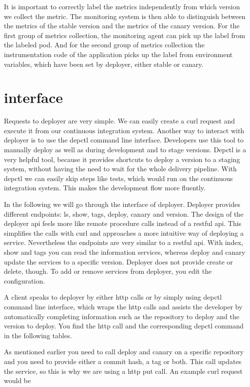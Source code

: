 It is important to correctly label the metrics independently from which version we collect
the metric. The monitoring system is then able to distinguish between the metrics of the
stable version and the metrics of the canary version. For the first group of metrics
collection, the monitoring agent can pick up the label from the labeled pod. And for the
second group of metrics collection the instrumentation code of the application picks up
the label from environment variables, which have been set by deployer, either stable or
canary.

\section{interface}
Requests to deployer are very simple. We can easily create a curl request and execute it
from our continuous integration system. Another way to interact with deployer is to use
the depctl command line interface. Developers use this tool to manually deploy as well as
during development and to stage versions. Depctl is a very helpful tool, because it
provides shortcuts to deploy a version to a staging system, without having the need to
wait for the whole delivery pipeline. With depctl we can easily skip steps like
tests, which would run on the continuous integration system. This makes the development
flow more fluently.

In the following we will go through the interface of deployer. Deployer provides different
endpoints: ls, show, tags, deploy, canary and version. The design of the deployer api
feels more like remote procedure calls instead of a restful api. This simplifies the calls
with curl and approaches a more intuitive way of deploying a service. Nevertheless the
endpoints are very similar to a restful api. With index, show and tags you can read the
information services, whereas deploy and canary update the services to a specific
version. Deployer does not provide create or delete, though. To add or remove services
from deployer, you edit the configuration.

A client speaks to deployer by either http calls or by simply using depctl command line
interface, which wraps the http calls and assists the developer by automatically
completing information such as the repository to deploy and the version to deploy. You
find the http call and the corresponding depctl command in the following tables.

As mentioned earlier you need to call deploy and canary on a specific repository and you
need to provide either a commit hash, a tag or both. This call updates the service, so
this is why we are using a http put call. An example curl request would be


